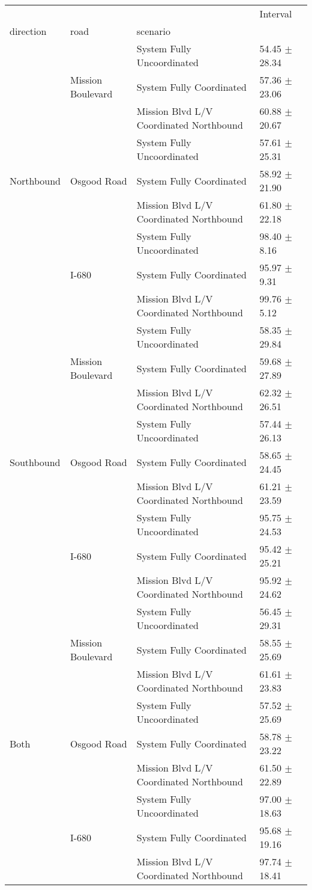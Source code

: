 \begin{tabular}{llll}
\toprule
 &  &  & Interval \\
direction & road & scenario &  \\
\midrule
\multirow[t]{9}{*}{Northbound} & \multirow[t]{3}{*}{Mission Boulevard} & System Fully Uncoordinated & 54.45 $\pm$ 28.34 \\
 &  & System Fully Coordinated & 57.36 $\pm$ 23.06 \\
 &  & Mission Blvd L/V Coordinated Northbound & 60.88 $\pm$ 20.67 \\
 & \multirow[t]{3}{*}{Osgood Road} & System Fully Uncoordinated & 57.61 $\pm$ 25.31 \\
 &  & System Fully Coordinated & 58.92 $\pm$ 21.90 \\
 &  & Mission Blvd L/V Coordinated Northbound & 61.80 $\pm$ 22.18 \\
 & \multirow[t]{3}{*}{I-680} & System Fully Uncoordinated & 98.40 $\pm$ 8.16 \\
 &  & System Fully Coordinated & 95.97 $\pm$ 9.31 \\
 &  & Mission Blvd L/V Coordinated Northbound & 99.76 $\pm$ 5.12 \\
\multirow[t]{9}{*}{Southbound} & \multirow[t]{3}{*}{Mission Boulevard} & System Fully Uncoordinated & 58.35 $\pm$ 29.84 \\
 &  & System Fully Coordinated & 59.68 $\pm$ 27.89 \\
 &  & Mission Blvd L/V Coordinated Northbound & 62.32 $\pm$ 26.51 \\
 & \multirow[t]{3}{*}{Osgood Road} & System Fully Uncoordinated & 57.44 $\pm$ 26.13 \\
 &  & System Fully Coordinated & 58.65 $\pm$ 24.45 \\
 &  & Mission Blvd L/V Coordinated Northbound & 61.21 $\pm$ 23.59 \\
 & \multirow[t]{3}{*}{I-680} & System Fully Uncoordinated & 95.75 $\pm$ 24.53 \\
 &  & System Fully Coordinated & 95.42 $\pm$ 25.21 \\
 &  & Mission Blvd L/V Coordinated Northbound & 95.92 $\pm$ 24.62 \\
\multirow[t]{9}{*}{Both} & \multirow[t]{3}{*}{Mission Boulevard} & System Fully Uncoordinated & 56.45 $\pm$ 29.31 \\
 &  & System Fully Coordinated & 58.55 $\pm$ 25.69 \\
 &  & Mission Blvd L/V Coordinated Northbound & 61.61 $\pm$ 23.83 \\
 & \multirow[t]{3}{*}{Osgood Road} & System Fully Uncoordinated & 57.52 $\pm$ 25.69 \\
 &  & System Fully Coordinated & 58.78 $\pm$ 23.22 \\
 &  & Mission Blvd L/V Coordinated Northbound & 61.50 $\pm$ 22.89 \\
 & \multirow[t]{3}{*}{I-680} & System Fully Uncoordinated & 97.00 $\pm$ 18.63 \\
 &  & System Fully Coordinated & 95.68 $\pm$ 19.16 \\
 &  & Mission Blvd L/V Coordinated Northbound & 97.74 $\pm$ 18.41 \\
\bottomrule
\end{tabular}
